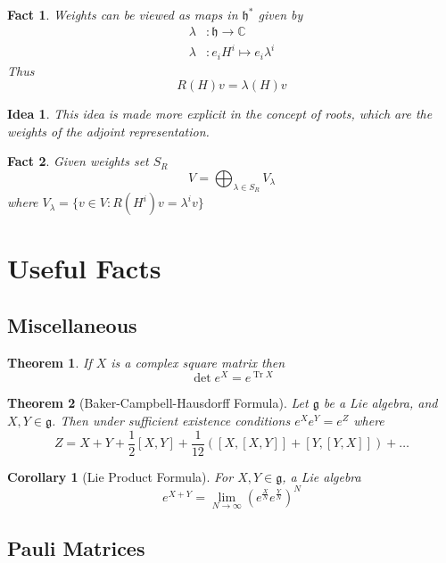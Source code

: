 \documentclass{article}
\newtheorem{theorem}{Theorem}[subsection]
\newtheorem{corollary}{Corollary}[theorem]
\newtheorem{fact}{Fact}[subsection]
\newtheorem*{idea}{Idea}
\DeclareMathOperator{\tr}{Tr}
\newcommand{\mf}[1]{\mathfrak{#1}}
\newcommand{\mbb}[1]{\mathbb{#1}}
\newcommand{\comm}[2][]{\left[ #1, #2 \right]}
\newcommand{\set}[1]{\lbrace #1 \rbrace}
\begin{document}
\begin{fact}
Weights can be viewed as maps in $\mf{h}^\ast$ given by 
\begin{align*}
\lambda &:\mf{h}\to\mbb{C} \\
\lambda &: e_i H^i \mapsto e_i \lambda^i
\end{align*}
Thus 
\[
R(H)v=\lambda(H)v
\]
\end{fact}

\begin{idea}
This idea is made more explicit in the concept of roots, which are the weights of the adjoint representation. 
\end{idea}

\begin{fact}
Given weights set $S_R$
\[
V=\bigoplus_{\lambda\in S_R} V_\lambda
\]
where $V_\lambda=\set{ v\in V : R(H^i)v=\lambda^i v}$
\end{fact}
\section{Useful Facts}

\subsection{Miscellaneous}
\begin{theorem}
If $X$ is a complex square matrix then 
\[
\det{e^X}=e^{\tr{X}}
\]
\end{theorem}

\begin{theorem}[Baker-Campbell-Hausdorff Formula]
Let $\mf{g}$ be a Lie algebra, and $X,Y\in\mf{g}$. Then under sufficient existence conditions $e^X e^Y=e^Z$ where
\[
Z=X+Y+\frac{1}{2}\comm[X]{Y}+\frac{1}{12}\left(\comm[X]{\comm[X]{Y}}+\comm[Y]{\comm[Y]{X}}\right)+\dots
\]
\end{theorem}

\begin{corollary}[Lie Product Formula]
For $X,Y\in\mf{g}$, a Lie algebra
\[
e^{X+Y}=\lim_{N\to\infty}\left( e^{\frac{X}{N}} e^{\frac{Y}{N}} \right)^N
\]
\end{corollary}
\subsection{Pauli Matrices}
\end{document}
